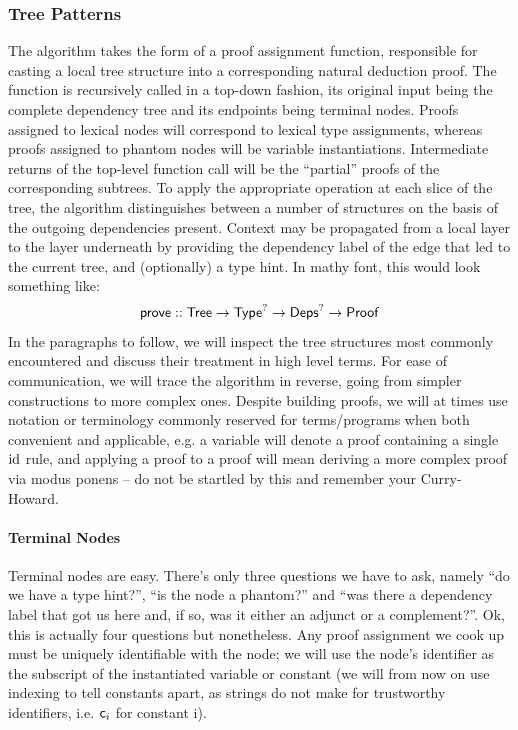 \subsubsection{Tree Patterns}
The algorithm takes the form of a proof assignment function, responsible for casting a local tree structure into a corresponding natural deduction proof.
The function is recursively called in a top-down fashion, its original input being the complete dependency tree and its endpoints being terminal nodes.
Proofs assigned to lexical nodes will correspond to lexical type assignments, whereas proofs assigned to phantom nodes will be variable instantiations.
Intermediate returns of the top-level function call will be the ``partial'' proofs of the corresponding subtrees.
To apply the appropriate operation at each slice of the tree, the algorithm distinguishes between a number of structures on the basis of the outgoing dependencies present.
Context may be propagated from a local layer to the layer underneath by providing the dependency label of the edge that led to the current tree, and (optionally) a type hint.
In mathy font, this would look something like:
\begin{align*}
\mathsf{prove} :: \mathsf{Tree} \to \mathsf{Type}^? \to {\ensuremath{\mathsf{Deps}}}^? \to \mathsf{Proof}
\end{align*}
In the paragraphs to follow, we will inspect the tree structures most commonly encountered and discuss their treatment in high level terms.
For ease of communication, we will trace the algorithm in reverse, going from simpler constructions to more complex ones.
Despite building proofs, we will at times use notation or terminology commonly reserved for terms/programs when both convenient and applicable, e.g. a variable will denote a proof containing a single $\mathrm{id}$ rule, and applying a proof to a proof will mean deriving a more complex proof via modus ponens -- do not be startled by this and remember your Curry-Howard.

\paragraph{Terminal Nodes}
Terminal nodes are easy.
There's only three questions we have to ask, namely ``do we have a type hint?'', ``is the node a phantom?'' and ``was there a dependency label that got us here and, if so, was it either an adjunct or a complement?''.
Ok, this is actually four questions but nonetheless.
Any proof assignment we cook up must be uniquely identifiable with the node; we will use the node's identifier as the subscript of the instantiated variable or constant (we will from now on use indexing to tell constants apart, as strings do not make for trustworthy identifiers, i.e. $\mathsf{c}_{\mathnormal{i}}$ for constant i).

